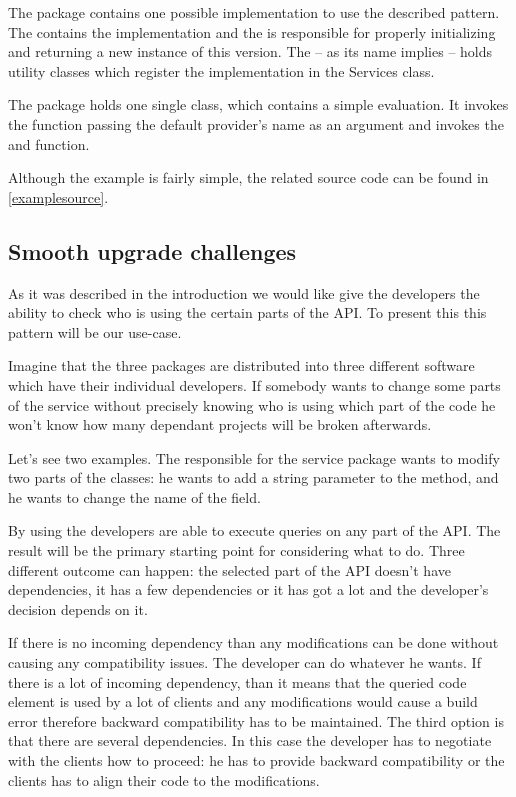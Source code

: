 The  package contains one possible implementation to use the
described pattern. The  contains the implementation and the
 is responsible for properly initializing and returning a
new instance of this version. The  -- as its name implies --
holds utility classes which register the implementation in the Services class.

The  package holds one single  class, which contains a
simple evaluation. It invokes the  function passing
the default provider's name as an argument and invokes the  and
 function.

Although the example is fairly simple, the related source code can be found in
\autoref{examplesource}.

\subsection{Smooth upgrade challenges}
As it was described in the introduction we would like give the developers the
ability to check who is using the certain parts of the API. To present this this
pattern will be our use-case.

Imagine that the three packages are distributed into three different software
which have their individual developers. If somebody wants to change some parts
of the service without precisely knowing who is using which part of the code he
won't know how many dependant projects will be broken afterwards.

Let's see two examples. The responsible for the service package wants to modify
two parts of the classes: he wants to add a string parameter to the
 method, and he wants to change the name of the
 field. 

By using \ptool{} the developers are able to execute queries on any part of the
API. The result will be the primary starting point for considering what to do.
Three different outcome can happen: the selected part of the API doesn't have
dependencies, it has a few dependencies or it has got a lot and the developer's
decision depends on it. 

If there is no incoming dependency than any modifications can be done without
causing any compatibility issues. The developer can do whatever he wants.
If there is a lot of incoming dependency, than it means that the queried code
element is used by a lot of clients and any modifications would cause a build
error therefore backward compatibility has to be maintained. The third option is
that there are several dependencies. In this case the developer has to negotiate
with the clients how to proceed: he has to provide backward compatibility or the
clients has to align their code to the modifications.

